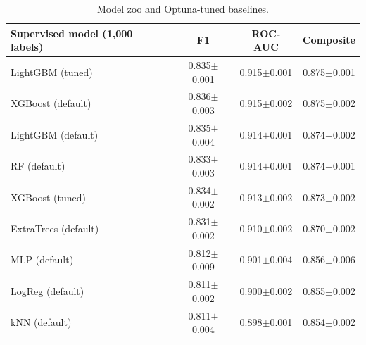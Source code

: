 \begin{table}[H]
\centering\small
\begin{tabular}{lccc}
\toprule
Supervised model (1,000 labels) & F1 & ROC-AUC & Composite\\
\midrule
LightGBM (tuned) & 0.835$\pm$0.001 & 0.915$\pm$0.001 & 0.875$\pm$0.001 \\
XGBoost (default) & 0.836$\pm$0.003 & 0.915$\pm$0.002 & 0.875$\pm$0.002 \\
LightGBM (default) & 0.835$\pm$0.004 & 0.914$\pm$0.001 & 0.874$\pm$0.002 \\
RF (default) & 0.833$\pm$0.003 & 0.914$\pm$0.001 & 0.874$\pm$0.001 \\
XGBoost (tuned) & 0.834$\pm$0.002 & 0.913$\pm$0.002 & 0.873$\pm$0.002 \\
ExtraTrees (default) & 0.831$\pm$0.002 & 0.910$\pm$0.002 & 0.870$\pm$0.002 \\
MLP (default) & 0.812$\pm$0.009 & 0.901$\pm$0.004 & 0.856$\pm$0.006 \\
LogReg (default) & 0.811$\pm$0.002 & 0.900$\pm$0.002 & 0.855$\pm$0.002 \\
kNN (default) & 0.811$\pm$0.004 & 0.898$\pm$0.001 & 0.854$\pm$0.002 \\
\bottomrule
\end{tabular}
\caption*{Model zoo and Optuna-tuned baselines.}
\end{table}
